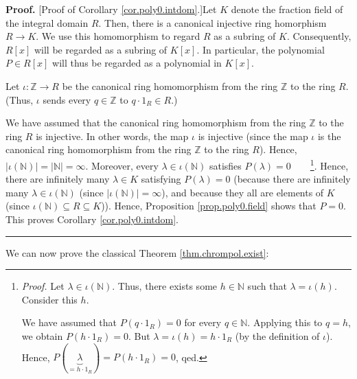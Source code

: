 \documentclass[numbers=enddot,12pt,final,onecolumn,notitlepage]{scrartcl}%
\theoremstyle{definition}
\newenvironment{proof}[1][Proof]{\noindent\textbf{#1.} }{\ \rule{0.5em}{0.5em}}
\newenvironment{verlong}{}{}
\begin{document}
\begin{verlong}
\begin{proof}
[Proof of Corollary \ref{cor.poly0.intdom}.]Let $K$ denote the fraction field
of the integral domain $R$. Then, there is a canonical injective ring
homorphism $R\rightarrow K$. We use this homomorphism to regard $R$ as a
subring of $K$. Consequently, $R\left[  x\right]  $ will be regarded as a
subring of $K\left[  x\right]  $. In particular, the polynomial $P\in R\left[
x\right]  $ will thus be regarded as a polynomial in $K\left[  x\right]  $.

Let $\iota:\mathbb{Z}\rightarrow R$ be the canonical ring homomorphism from
the ring $\mathbb{Z}$ to the ring $R$. (Thus, $\iota$ sends every
$q\in\mathbb{Z}$ to $q\cdot1_{R}\in R$.)

We have assumed that the canonical ring homomorphism from the ring
$\mathbb{Z}$ to the ring $R$ is injective. In other words, the map $\iota$ is
injective (since the map $\iota$ is the canonical ring homomorphism from the
ring $\mathbb{Z}$ to the ring $R$). Hence, $\left\vert \iota\left(
\mathbb{N}\right)  \right\vert =\left\vert \mathbb{N}\right\vert =\infty$.
Moreover, every $\lambda\in\iota\left(  \mathbb{N}\right)  $ satisfies
$P\left(  \lambda\right)  =0$\ \ \ \ \footnote{\textit{Proof.} Let $\lambda
\in\iota\left(  \mathbb{N}\right)  $. Thus, there exists some $h\in\mathbb{N}$
such that $\lambda=\iota\left(  h\right)  $. Consider this $h$.
\par
We have assumed that $P\left(  q\cdot1_{R}\right)  =0$ for every
$q\in\mathbb{N}$. Applying this to $q=h$, we obtain $P\left(  h\cdot
1_{R}\right)  =0$. But $\lambda=\iota\left(  h\right)  =h\cdot1_{R}$ (by the
definition of $\iota$). Hence, $P\left(  \underbrace{\lambda}_{=h\cdot1_{R}%
}\right)  =P\left(  h\cdot1_{R}\right)  =0$, qed.}. Hence, there are
infinitely many $\lambda\in K$ satisfying $P\left(  \lambda\right)  =0$
(because there are infinitely many $\lambda\in\iota\left(  \mathbb{N}\right)
$ (since $\left\vert \iota\left(  \mathbb{N}\right)  \right\vert =\infty$),
and because they all are elements of $K$ (since $\iota\left(  \mathbb{N}%
\right)  \subseteq R\subseteq K$)). Hence, Proposition \ref{prop.poly0.field}
shows that $P=0$. This proves Corollary \ref{cor.poly0.intdom}.
\end{proof}
\end{verlong}

We can now prove the classical Theorem \ref{thm.chrompol.exist}:
\end{document}
